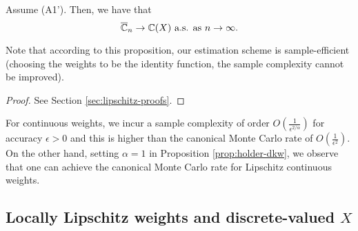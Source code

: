\begin{proposition}
\label{prop:lipschitz}
Assume (A1'). Then, we have that 
$$\overline {\mathbb{C}}_n
\rightarrow
\mathbb{C}(X)
 \text{   a.s. as } n\rightarrow \infty.
$$
\end{proposition}
Note that according to this proposition, our estimation scheme is sample-efficient (choosing the weights to be the identity function, the sample complexity cannot be improved).
\begin{proof}
See Section \ref{sec:lipschitz-proofs}.
\end{proof}

\begin{remark}
 For \holder continuous weights, we incur a sample complexity of order $O\left(\frac1{\epsilon^{2/\alpha}}\right)$ for accuracy $\epsilon>0$ and this is higher than the canonical Monte Carlo rate of $O\left(\frac1{\epsilon^2}\right)$. On the other hand, setting $\alpha=1$ in Proposition \ref{prop:holder-dkw}, we observe that one can achieve the canonical Monte Carlo rate for Lipschitz continuous weights.
\end{remark}

\subsection{Locally Lipschitz weights and discrete-valued $X$}

